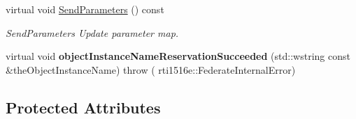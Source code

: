 \begin{DoxyCompactItemize}
virtual void \hyperlink{classUPIM_1_1UPIMFederate_a1a5150d7771e9b8ae0dc63b06a450b39}{Send\+Parameters} () const
\begin{DoxyCompactList}\small\item\em Send\+Parameters Update parameter map. \end{DoxyCompactList}\item 
\mbox{\label{classUPIM_1_1UPIMFederate_ac928c08ee2c9f8c550e0c8676b9bcd60}} 
virtual void {\bfseries object\+Instance\+Name\+Reservation\+Succeeded} (std\+::wstring const \&the\+Object\+Instance\+Name)  throw (							        rti1516e\+::\+Federate\+Internal\+Error)
\end{DoxyCompactItemize}
\subsection*{Protected Attributes}
